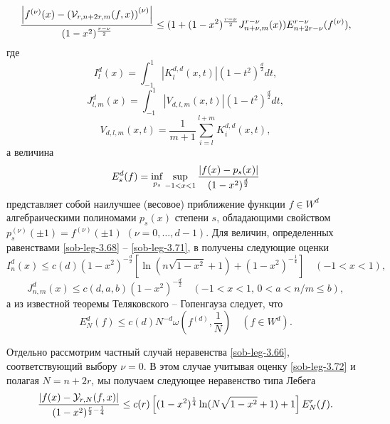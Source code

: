   \begin{equation}\label{sob-leg-3.67}
   {\left|f^{(\nu)}(x)-\left(\mathcal{V }_{r,n+2r,m}(f,x)\right)^{(\nu)}\right|\over(1-x^2)^\frac{r-\nu}{2}}
\le  (1+(1-x^2)^\frac{r-\nu}{2}J^{r-\nu}_{n+\nu,m}(x))
E^{r-\nu}_{n+2r-\nu}(f^{(\nu)}),
\end{equation}
где
\begin{equation}\label{sob-leg-3.68}
I^{d}_{l}(x)= \int_{-1}^{1}|K^{d,d}_{l}(x,t)|(1-t^2)^{\frac{d}{2}}dt,
\end{equation}
\begin{equation}\label{sob-leg-3.69}
J^{d}_{l,m}(x)= \int_{-1}^{1}|V_{d,l,m}(x,t)|(1-t^2)^{\frac{d}{2}}dt,
\end{equation}
\begin{equation}\label{sob-leg-3.70}
V_{d,l,m}(x,t)=\frac{1}{m+1}\sum_{i=l}^{l+m}K^{d,d}_i(x,t),
\end{equation}
а величина
\begin{equation}\label{sob-leg-3.71}
E_s^d(f)=\inf_{p_s}\sup_{-1<x<1}{|f(x)-p_s(x)|\over (1-x^2)^\frac{d}{2}}
\end{equation}
представляет собой наилучшее (весовое) приближение функции $f\in W^d$ алгебраическими полиномами $p_s(x)$ степени
$s$, обладающими свойством $p_s^{(\nu)}(\pm1)=f^{(\nu)}(\pm1)$ $(\nu=0,\ldots, d-1)$. Для величин, определенных равенствами \eqref{sob-leg-3.68} -- \eqref{sob-leg-3.71}, в \cite{Haar-Tcheb-Shar15,sob-jac-discrete-Shar17} получены следующие оценки
\begin{equation}\label{sob-leg-3.72}
I^d_n(x)\le c(d)(1-x^2)^{-\frac{d}{2}}\left[\ln(n\sqrt{1-x^2}+1)+(1-x^2)^{-\frac14}\right]\quad(-1<x<1),
\end{equation}
\begin{equation}\label{sob-leg-3.73}
J^d_{n,m}(x)\le c(d,a,b)(1-x^2)^{-\frac{d}{2}}\quad (-1<x<1,\, 0< a<n/m\le b),
\end{equation}
а из известной теоремы Теляковского -- Гопенгауза \cite{sob-jac-discrete-Tel,sob-jac-discrete-Gop} следует, что
\begin{equation}\label{sob-leg-3.74}
E_N^d(f)\le c(d)N^{-d}\omega(f^{(d)},\frac{1}{N})\quad (f\in W^d).
\end{equation}

Отдельно рассмотрим частный случай неравенства \eqref{sob-leg-3.66}, соответствующий выбору $\nu=0$. В этом случае  учитывая оценку \eqref{sob-leg-3.72} и полагая $N=n+2r$, мы получаем следующее неравенство типа Лебега
\begin{equation}\label{sob-leg-3.75}
{\left|f(x)-\mathcal{Y}_{r,N}(f,x)\right|
\over(1-x^2)^{\frac{r}{2}-\frac14}}\le c(r)\left[(1-x^2)^{\frac14}\ln(N\sqrt{1-x^2}+1)+1\right]E^{r}_{N}(f).
  \end{equation}

